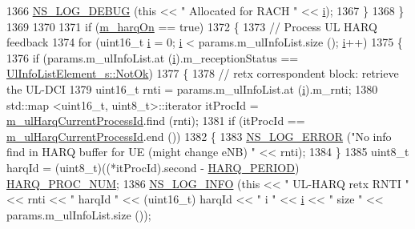 \begin{DoxyCode}
1366           \hyperlink{group__logging_ga413f1886406d49f59a6a0a89b77b4d0a}{NS\_LOG\_DEBUG} (\textcolor{keyword}{this} << \textcolor{stringliteral}{" Allocated for RACH "} << \hyperlink{bernuolliDistribution_8m_a6f6ccfcf58b31cb6412107d9d5281426}{i});
1367         \}
1368     \}
1369 
1370 
1371   \textcolor{keywordflow}{if} (\hyperlink{classns3_1_1TdMtFfMacScheduler_af0253034544a704cb4d8583fae9377a3}{m\_harqOn} == \textcolor{keyword}{true})
1372     \{
1373       \textcolor{comment}{//   Process UL HARQ feedback}
1374       \textcolor{keywordflow}{for} (uint16\_t \hyperlink{bernuolliDistribution_8m_a6f6ccfcf58b31cb6412107d9d5281426}{i} = 0; \hyperlink{bernuolliDistribution_8m_a6f6ccfcf58b31cb6412107d9d5281426}{i} < params.m\_ulInfoList.size (); \hyperlink{bernuolliDistribution_8m_a6f6ccfcf58b31cb6412107d9d5281426}{i}++)
1375         \{        
1376           \textcolor{keywordflow}{if} (params.m\_ulInfoList.at (\hyperlink{bernuolliDistribution_8m_a6f6ccfcf58b31cb6412107d9d5281426}{i}).m\_receptionStatus == 
      \hyperlink{structns3_1_1UlInfoListElement__s_a2a4dff5145d25c81086660e991db6f61a98aed738fd24811d3461668e394a53c8}{UlInfoListElement\_s::NotOk})
1377             \{
1378               \textcolor{comment}{// retx correspondent block: retrieve the UL-DCI}
1379               uint16\_t rnti = params.m\_ulInfoList.at (\hyperlink{bernuolliDistribution_8m_a6f6ccfcf58b31cb6412107d9d5281426}{i}).m\_rnti;
1380               std::map <uint16\_t, uint8\_t>::iterator itProcId = 
      \hyperlink{classns3_1_1TdMtFfMacScheduler_a01393611d03f7107ec6c0a0db95858c2}{m\_ulHarqCurrentProcessId}.find (rnti);
1381               \textcolor{keywordflow}{if} (itProcId == \hyperlink{classns3_1_1TdMtFfMacScheduler_a01393611d03f7107ec6c0a0db95858c2}{m\_ulHarqCurrentProcessId}.end ())
1382                 \{
1383                   \hyperlink{group__logging_ga0261a8db1d4ac5f79417d117634fd455}{NS\_LOG\_ERROR} (\textcolor{stringliteral}{"No info find in HARQ buffer for UE (might change eNB) "} << 
      rnti);
1384                 \}
1385               uint8\_t harqId = (uint8\_t)((*itProcId).second - \hyperlink{lte-common_8h_a275321ee206f130c3ddc81fcdaa13cfd}{HARQ\_PERIOD}) %
      \hyperlink{cqa-ff-mac-scheduler_8h_a9185d8d7d2b2979181d4a7044a3d3555}{HARQ\_PROC\_NUM};
1386               \hyperlink{group__logging_gafbd73ee2cf9f26b319f49086d8e860fb}{NS\_LOG\_INFO} (\textcolor{keyword}{this} << \textcolor{stringliteral}{" UL-HARQ retx RNTI "} << rnti << \textcolor{stringliteral}{" harqId "} << (uint16\_t)
      harqId << \textcolor{stringliteral}{" i "} << \hyperlink{bernuolliDistribution_8m_a6f6ccfcf58b31cb6412107d9d5281426}{i} << \textcolor{stringliteral}{" size "}  << params.m\_ulInfoList.size ());

\end{DoxyCode}
